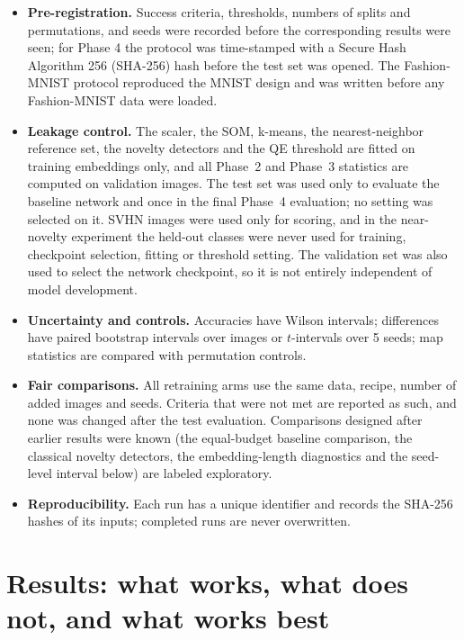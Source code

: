 \documentclass[preprint,review,12pt]{elsarticle}
\begin{document}
\begin{itemize}
  \item \textbf{Pre-registration.} Success criteria, thresholds, numbers of splits and permutations, and seeds were recorded before the corresponding results were seen; for Phase 4 the protocol was time-stamped with a Secure Hash Algorithm 256 (SHA-256) hash before the test set was opened. The Fashion-MNIST protocol reproduced the MNIST design and was written before any Fashion-MNIST data were loaded.
  \item \textbf{Leakage control.} The scaler, the SOM, k-means, the nearest-neighbor reference set, the novelty detectors and the QE threshold are fitted on training embeddings only, and all Phase~2 and Phase~3 statistics are computed on validation images. The test set was used only to evaluate the baseline network and once in the final Phase~4 evaluation; no setting was selected on it. SVHN images were used only for scoring, and in the near-novelty experiment the held-out classes were never used for training, checkpoint selection, fitting or threshold setting. The validation set was also used to select the network checkpoint, so it is not entirely independent of model development.
  \item \textbf{Uncertainty and controls.} Accuracies have Wilson intervals; differences have paired bootstrap intervals over images or $t$-intervals over 5 seeds; map statistics are compared with permutation controls.
  \item \textbf{Fair comparisons.} All retraining arms use the same data, recipe, number of added images and seeds. Criteria that were not met are reported as such, and none was changed after the test evaluation. Comparisons designed after earlier results were known (the equal-budget baseline comparison, the classical novelty detectors, the embedding-length diagnostics and the seed-level interval below) are labeled exploratory.
  \item \textbf{Reproducibility.} Each run has a unique identifier and records the SHA-256 hashes of its inputs; completed runs are never overwritten.
\end{itemize}

\FloatBarrier
\section{Results: what works, what does not, and what works best}\label{sec:results}
\end{document}
